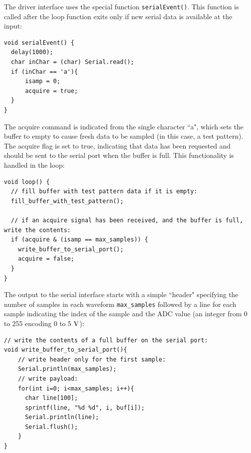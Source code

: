\documentclass[12pt]{article}
\begin{document}
The driver interface uses the special function {\tt serialEvent()}.  This function is called after the loop function exits only if new serial data is available at the input:
\begin{verbatim}
void serialEvent() { 
  delay(1000);
  char inChar = (char) Serial.read();
  if (inChar == 'a'){
      isamp = 0;
      acquire = true;
  }
}
\end{verbatim}
The acquire command is indicated from the single character ``a", which sets the buffer to empty to cause fresh data to be sampled (in this case, a test pattern).  The acquire flag is set to true, indicating that data has been requested and should be sent to the serial port when the buffer is full.  This functionality is handled in the loop: 
\begin{verbatim}
void loop() {    
  // fill buffer with test pattern data if it is empty:
  fill_buffer_with_test_pattern();

  // if an acquire signal has been received, and the buffer is full, write the contents:
  if (acquire & (isamp == max_samples)) {
    write_buffer_to_serial_port();
    acquire = false;
  }
}
\end{verbatim}
The output to the serial interface starts with a simple ``header" specifying the number of samples in each waveform {\tt max\_samples} followed by a line for each sample indicating the index of the sample and the ADC value (an integer from 0 to 255 encoding 0 to $5~\rm V$):  
\begin{verbatim}
// write the contents of a full buffer on the serial port:
void write_buffer_to_serial_port(){
    // write header only for the first sample:
    Serial.println(max_samples);
    // write payload:
    for(int i=0; i<max_samples; i++){
      char line[100];
      sprintf(line, "%d %d", i, buf[i]);
      Serial.println(line);
      Serial.flush();
    }
}
\end{verbatim}
\end{document}
